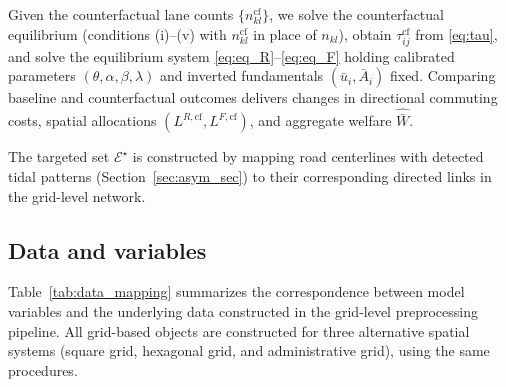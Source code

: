 \documentclass[12pt]{article}
\begin{document}
	Given the counterfactual lane counts $\{n_{kl}^{\mathrm{cf}}\}$, we solve the counterfactual equilibrium (conditions (i)--(v) with $n_{kl}^{\mathrm{cf}}$ in place of $n_{kl}$), obtain $\tau_{ij}^{\mathrm{cf}}$ from \eqref{eq:tau}, and solve the equilibrium system \eqref{eq:eq_R}--\eqref{eq:eq_F} holding calibrated parameters $(\theta,\alpha,\beta,\lambda)$ and inverted fundamentals $(\bar{u}_i,\bar{A}_i)$ fixed. Comparing baseline and counterfactual outcomes delivers changes in directional commuting costs, spatial allocations $(L^{R,\mathrm{cf}},L^{F,\mathrm{cf}})$, and aggregate welfare $\hat{\bar{W}}$.

	The targeted set $\mathcal{E}^\star$ is constructed by mapping road centerlines with detected tidal patterns (Section~\ref{sec:asym_sec}) to their corresponding directed links in the grid-level network.
	
	\subsection{Data and variables}
	Table~\ref{tab:data_mapping} summarizes the correspondence between model variables
	and the underlying data constructed in the grid-level preprocessing pipeline.
	All grid-based objects are constructed for three alternative spatial systems
	(square grid, hexagonal grid, and administrative grid), using the same procedures.
	
\end{document}
